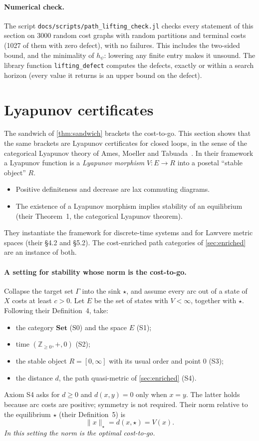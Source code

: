 \documentclass[11pt]{article}
\theoremstyle{definition}
\theoremstyle{remark}
\newcommand{\dd}{d}
\newcommand{\tgt}{\star}
\begin{document}
\paragraph{Numerical check.}
The script \texttt{docs/scripts/path\_lifting\_check.jl} checks every statement of
this section on 3000 random cost graphs with random partitions and terminal costs
(1027 of them with zero defect), with no failures. This includes the two-sided
bound, and the minimality of $h_\psi$: lowering any finite entry makes it unsound.
The library function \texttt{lifting\_defect} computes the defects, exactly or
within a search horizon (every value it returns is an upper bound on the defect).

\section{Lyapunov certificates}\label{sec:lyapunov}

The sandwich of \cref{thm:sandwich} brackets the cost-to-go. This section shows
that the same brackets are Lyapunov certificates for closed loops, in the sense of
the categorical Lyapunov theory of Ames, Moeller and
Tabuada~\cite{ames2025clt1}. In their framework a Lyapunov function is a
\emph{Lyapunov morphism} $V : E \to R$ into a posetal ``stable object'' $R$.
\begin{itemize}[nosep]
\item Positive definiteness and decrease are lax commuting diagrams.
\item The existence of a Lyapunov morphism implies stability of an equilibrium
  (their Theorem~1, the categorical Lyapunov theorem).
\end{itemize}
They instantiate the framework for discrete-time systems and for Lawvere metric
spaces (their \S4.2 and \S5.2). The cost-enriched path categories of
\cref{sec:enriched} are an instance of both.

\paragraph{A setting for stability whose norm is the cost-to-go.}
Collapse the target set $\Gamma$ into the sink $\tgt$, and assume every arc out of
a state of $X$ costs at least $c > 0$. Let $E$ be the set of states with
$V < \infty$, together with $\tgt$. Following their Definition~4, take:
\begin{itemize}[nosep]
\item the category $\mathbf{Set}$ (S0) and the space $E$ (S1);
\item time $(\mathbb Z_{\ge 0}, +, 0)$ (S2);
\item the stable object $R = [0,\infty]$ with its usual order and point $0$ (S3);
\item the distance $\dd$, the path quasi-metric of \cref{sec:enriched} (S4).
\end{itemize}
Axiom S4 asks for $\dd \ge 0$ and $\dd(x,y) = 0$ only when $x = y$. The latter
holds because arc costs are positive; symmetry is not required. Their norm
relative to the equilibrium $\tgt$ (their Definition~5) is
\[ \|x\|_{\tgt} = \dd(x, \tgt) = V(x). \]
\emph{In this setting the norm is the optimal cost-to-go.}
\end{document}
